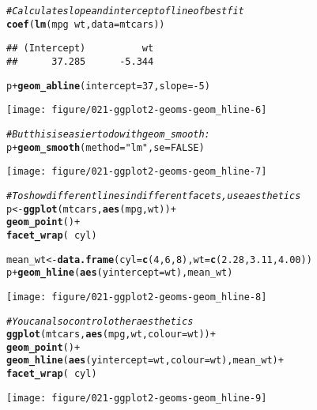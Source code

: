 \documentclass[a4paper,titlepage]{tufte-handout}\usepackage[]{graphicx}\usepackage[]{color}
\makeatletter
\def\maxwidth{ %
  \ifdim\Gin@nat@width>\linewidth
    \linewidth
  \else
    \Gin@nat@width
  \fi
}
\newcommand{\hlnum}[1]{\textcolor[rgb]{0.686,0.059,0.569}{#1}}%
\newcommand{\hlstr}[1]{\textcolor[rgb]{0.192,0.494,0.8}{#1}}%
\newcommand{\hlcom}[1]{\textcolor[rgb]{0.678,0.584,0.686}{\textit{#1}}}%
\newcommand{\hlopt}[1]{\textcolor[rgb]{0,0,0}{#1}}%
\newcommand{\hlstd}[1]{\textcolor[rgb]{0.345,0.345,0.345}{#1}}%
\newcommand{\hlkwb}[1]{\textcolor[rgb]{0.69,0.353,0.396}{#1}}%
\newcommand{\hlkwc}[1]{\textcolor[rgb]{0.333,0.667,0.333}{#1}}%
\newcommand{\hlkwd}[1]{\textcolor[rgb]{0.737,0.353,0.396}{\textbf{#1}}}%
\newenvironment{kframe}{%
 \def\at@end@of@kframe{}%
 \ifinner\ifhmode%
  \def\at@end@of@kframe{\end{minipage}}%
  \begin{minipage}{\columnwidth}%
 \fi\fi%
 \def\FrameCommand##1{\hskip\@totalleftmargin \hskip-\fboxsep
 \colorbox{shadecolor}{##1}\hskip-\fboxsep
     \hskip-\linewidth \hskip-\@totalleftmargin \hskip\columnwidth}%
 \MakeFramed {\advance\hsize-\width
   \@totalleftmargin\z@ \linewidth\hsize
   \@setminipage}}%
 {\par\unskip\endMakeFramed%
 \at@end@of@kframe}
\newenvironment{knitrout}{}{} %
\makeatother
\begin{document}
\begin{knitrout}
\begin{kframe}
\begin{alltt}
\hlcom{# Calculate slope and intercept of line of best fit}
\hlkwd{coef}\hlstd{(}\hlkwd{lm}\hlstd{(mpg} \hlopt{~} \hlstd{wt,} \hlkwc{data} \hlstd{= mtcars))}
\end{alltt}
\begin{verbatim}
## (Intercept)          wt 
##      37.285      -5.344
\end{verbatim}
\begin{alltt}
\hlstd{p} \hlopt{+} \hlkwd{geom_abline}\hlstd{(}\hlkwc{intercept} \hlstd{=} \hlnum{37}\hlstd{,} \hlkwc{slope} \hlstd{=} \hlopt{-}\hlnum{5}\hlstd{)}
\end{alltt}
\end{kframe}
\texttt{[image: figure/021-ggplot2-geoms-geom\_hline-6]} 
\begin{kframe}\begin{alltt}
\hlcom{# But this is easier to do with geom_smooth:}
\hlstd{p} \hlopt{+} \hlkwd{geom_smooth}\hlstd{(}\hlkwc{method} \hlstd{=} \hlstr{"lm"}\hlstd{,} \hlkwc{se} \hlstd{=} \hlnum{FALSE}\hlstd{)}
\end{alltt}
\end{kframe}
\texttt{[image: figure/021-ggplot2-geoms-geom\_hline-7]} 
\begin{kframe}\begin{alltt}
\hlcom{# To show different lines in different facets, use aesthetics}
\hlstd{p} \hlkwb{<-} \hlkwd{ggplot}\hlstd{(mtcars,} \hlkwd{aes}\hlstd{(mpg, wt))} \hlopt{+}
  \hlkwd{geom_point}\hlstd{()} \hlopt{+}
  \hlkwd{facet_wrap}\hlstd{(}\hlopt{~} \hlstd{cyl)}

\hlstd{mean_wt} \hlkwb{<-} \hlkwd{data.frame}\hlstd{(}\hlkwc{cyl} \hlstd{=} \hlkwd{c}\hlstd{(}\hlnum{4}\hlstd{,} \hlnum{6}\hlstd{,} \hlnum{8}\hlstd{),} \hlkwc{wt} \hlstd{=} \hlkwd{c}\hlstd{(}\hlnum{2.28}\hlstd{,} \hlnum{3.11}\hlstd{,} \hlnum{4.00}\hlstd{))}
\hlstd{p} \hlopt{+} \hlkwd{geom_hline}\hlstd{(}\hlkwd{aes}\hlstd{(}\hlkwc{yintercept} \hlstd{= wt), mean_wt)}
\end{alltt}
\end{kframe}
\texttt{[image: figure/021-ggplot2-geoms-geom\_hline-8]} 
\begin{kframe}\begin{alltt}
\hlcom{# You can also control other aesthetics}
\hlkwd{ggplot}\hlstd{(mtcars,} \hlkwd{aes}\hlstd{(mpg, wt,} \hlkwc{colour} \hlstd{= wt))} \hlopt{+}
  \hlkwd{geom_point}\hlstd{()} \hlopt{+}
  \hlkwd{geom_hline}\hlstd{(}\hlkwd{aes}\hlstd{(}\hlkwc{yintercept} \hlstd{= wt,} \hlkwc{colour} \hlstd{= wt), mean_wt)} \hlopt{+}
  \hlkwd{facet_wrap}\hlstd{(}\hlopt{~} \hlstd{cyl)}
\end{alltt}
\end{kframe}
\texttt{[image: figure/021-ggplot2-geoms-geom\_hline-9]} 

\end{knitrout}
\end{document}
